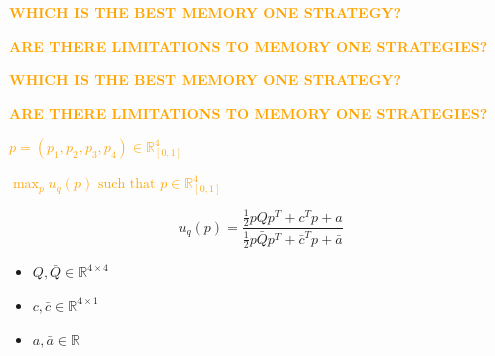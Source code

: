 \documentclass{beamer}
\begin{document}
\begin{frame}
    \begin{mdframed}[style=blank]
    \centering
    \large{
    \textbf{\textcolor{orange}{WHICH IS THE BEST MEMORY ONE STRATEGY?}}}
    \end{mdframed}
    \begin{mdframed}[style=blank]
    \centering
    \large{
    \textbf{\textcolor{orange}{ARE THERE LIMITATIONS TO MEMORY ONE STRATEGIES?}}}
    \end{mdframed}
\end{frame}

\begin{frame}
    \begin{mdframed}[style=framed]
    \centering
    \large{
    \textbf{\textcolor{orange}{WHICH IS THE BEST MEMORY ONE STRATEGY?}}}
    \end{mdframed}
    \begin{mdframed}[style=blank]
    \centering
    \large{
    \textbf{\textcolor{orange}{ARE THERE LIMITATIONS TO MEMORY ONE STRATEGIES?}}}
    \end{mdframed}
\end{frame}


\begin{frame}
    \centering
    
  
    \vfill
    \textcolor{orange}{
    \large
    \boldmath\( p = (p_1, p_2, p_3, p_4) \in\mathbb{R}_{[0,1]}^{4} \)}
\end{frame}

\begin{frame}
    \centering
    
\end{frame}

\begin{frame}
    \centering
    \Large\textcolor{orange}{
    \boldmath \( \max_p u_q(p)\text{ such that }p\in\mathbb{R}_{[0,1]}^{4}\)}
\end{frame}

\begin{frame}
    \begin{center}
    \begin{theorem}
     \boldmath\[ u_q(p) = \frac{\frac{1}{2} p Q  p^T + c^T  p + a} 
    {\frac{1}{2} p \bar{Q} p^T + \bar{c}^T p + \bar{a}}\]

    \begin{itemize}
      \item \boldmath\(Q, \bar{Q} \in\mathbb{R}^{4 \times 4}\)
      \item \boldmath\(c, \bar{c}\in\mathbb{R}^{4 \times 1}\) 
      \item \boldmath\(a, \bar{a}\in\mathbb{R}\)  
   \end{itemize}
    \end{theorem}
    \end{center}
\end{frame}
\end{document}

